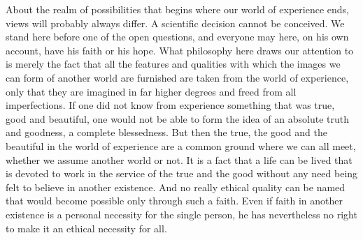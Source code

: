 \documentclass[12pt,a4paper,openany]{book}
\newcommand{\opage}[1]{\marginnote{\footnotesize\textit{[#1]}}}
\begin{document}
About the realm of possibilities that begins where our world of experience ends, views will probably always
\opage{198}differ. A scientific decision cannot be conceived. We stand here before one of the open questions, and
everyone may here, on his own account, have his faith or his hope. What philosophy here draws our attention to is
merely the fact that all the features and qualities with which the images we can form of another world are
furnished are taken from the world of experience, only that they are imagined in far higher degrees and freed
from all imperfections. If one did not know from experience something that was true, good and beautiful, one
would not be able to form the idea of an absolute truth and goodness, a complete blessedness. But then the true,
the good and the beautiful in the world of experience are a common ground where we can all meet, whether we
assume another world or not. It is a fact that a life can be lived that is devoted to work in the service of the
true and the good without any need being felt to believe in another existence. And no really ethical quality can
be named that would become possible only through such a faith. Even if faith in another existence is a personal
necessity for the single person, he has nevertheless no right to make it an ethical necessity for all.
\end{document}
